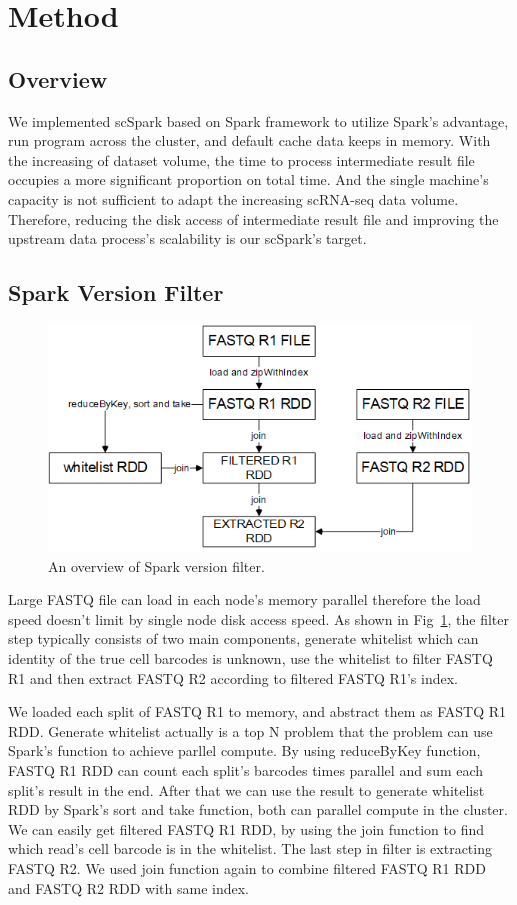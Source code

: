 \documentclass[runningheads]{llncs}
\begin{document}
\section{Method}
\subsection{Overview}
We implemented scSpark based on Spark framework to utilize Spark's advantage, run program across the cluster, and default cache data keeps in memory.
With the increasing of dataset volume, the time to process intermediate result file occupies a more significant proportion on total time.
And the single machine's capacity is not sufficient to adapt the increasing scRNA-seq data volume.
Therefore, reducing the disk access of intermediate result file and improving the upstream data process's scalability is our scSpark's target.

\subsection{Spark Version Filter}
\begin{figure}
  \includegraphics[width=\textwidth]{fig1.png}
  \caption{An overview of Spark version filter.} \label{fig1}
\end{figure}  
Large FASTQ file can load in each node's memory parallel therefore the load speed doesn't limit by single node disk access speed.
As shown in Fig~\ref{fig1}, the filter step typically consists of two main components, generate whitelist which can identity of the true cell barcodes is unknown, use the whitelist to filter FASTQ R1 and then extract FASTQ R2 according to filtered FASTQ R1's index.

We loaded each split of FASTQ R1 to memory, and abstract them as FASTQ R1 RDD.
Generate whitelist actually is a top N problem that the problem can use Spark's function to achieve parllel compute.
By using reduceByKey function, FASTQ R1 RDD can count each split's barcodes times parallel and sum each split's result in the end.
After that we can use the result to generate whitelist RDD by Spark's sort and take function, both can parallel compute in the cluster.
We can easily get filtered FASTQ R1 RDD, by using the join function to find which read's cell barcode is in the whitelist.
The last step in filter is extracting FASTQ R2.
We used join function again to combine filtered FASTQ R1 RDD and FASTQ R2 RDD with same index.
\end{document}
